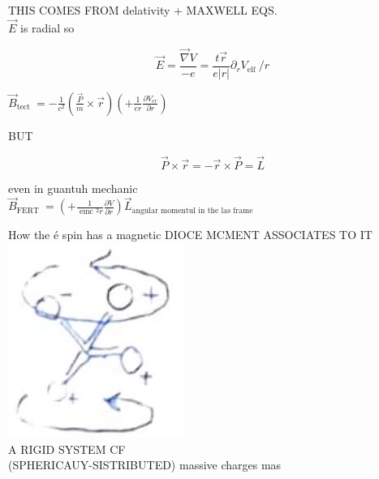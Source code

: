 \documentclass[10pt]{article}
\begin{document}
THIS COMES FROM delativity + MAXWELL EQS.\\
$\vec{E}$ is radial so

$$
\vec{E}=\frac{\vec{\nabla} V}{-e}=\frac{t \vec{r}}{e|r|} \partial_{r} V_{\text {elf }} / r
$$

$\vec{B}_{\text {tect }}=-\frac{1}{c^{2}}\left(\frac{\vec{P}}{m} \times \vec{r}\right)\left(+\frac{1}{e r} \frac{\partial V_{e r}}{\partial r}\right)$

BUT

$$
\vec{P} \times \vec{r}=-\vec{r} \times \vec{P}=\vec{L}
$$

even in guantuh mechanic\\
$\vec{B}_{\text {FERT }}=\left(+\frac{1}{\text { emc }{ }^{2} r} \frac{\partial V}{\partial r}\right) \vec{L}_{\text {angular momentul in the las frame }}$

How the é spin has a magnetic DIOCE MCMENT ASSOCIATES TO IT\\
\includegraphics[max width=\textwidth, center]{2025_10_16_e34e240cf6beac2f9e0dg-2(2)}\\
A RIGID SYSTEM CF\\
(SPHERICAUY-SISTRIBUTED) massive charges mas
\end{document}
